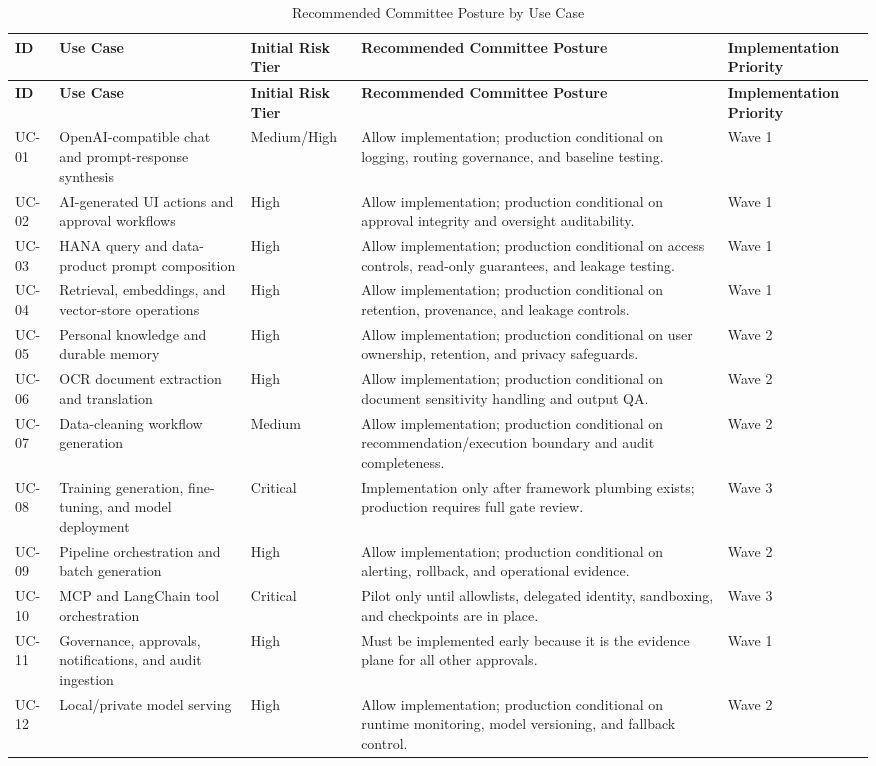 \documentclass[11pt,a4paper]{article}
\begin{document}
\begin{longtable}{P{0.08\textwidth}P{0.24\textwidth}P{0.12\textwidth}P{0.24\textwidth}P{0.18\textwidth}}
\caption{Recommended Committee Posture by Use Case} \\
\toprule
\textbf{ID} & \textbf{Use Case} & \textbf{Initial Risk Tier} & \textbf{Recommended Committee Posture} & \textbf{Implementation Priority} \\
\midrule
\endfirsthead
\toprule
\textbf{ID} & \textbf{Use Case} & \textbf{Initial Risk Tier} & \textbf{Recommended Committee Posture} & \textbf{Implementation Priority} \\
\midrule
\endhead
UC-01 & OpenAI-compatible chat and prompt-response synthesis & Medium/High & Allow implementation; production conditional on logging, routing governance, and baseline testing. & Wave 1 \\
UC-02 & AI-generated UI actions and approval workflows & High & Allow implementation; production conditional on approval integrity and oversight auditability. & Wave 1 \\
UC-03 & HANA query and data-product prompt composition & High & Allow implementation; production conditional on access controls, read-only guarantees, and leakage testing. & Wave 1 \\
UC-04 & Retrieval, embeddings, and vector-store operations & High & Allow implementation; production conditional on retention, provenance, and leakage controls. & Wave 1 \\
UC-05 & Personal knowledge and durable memory & High & Allow implementation; production conditional on user ownership, retention, and privacy safeguards. & Wave 2 \\
UC-06 & OCR document extraction and translation & High & Allow implementation; production conditional on document sensitivity handling and output QA. & Wave 2 \\
UC-07 & Data-cleaning workflow generation & Medium & Allow implementation; production conditional on recommendation/execution boundary and audit completeness. & Wave 2 \\
UC-08 & Training generation, fine-tuning, and model deployment & Critical & Implementation only after framework plumbing exists; production requires full gate review. & Wave 3 \\
UC-09 & Pipeline orchestration and batch generation & High & Allow implementation; production conditional on alerting, rollback, and operational evidence. & Wave 2 \\
UC-10 & MCP and LangChain tool orchestration & Critical & Pilot only until allowlists, delegated identity, sandboxing, and checkpoints are in place. & Wave 3 \\
UC-11 & Governance, approvals, notifications, and audit ingestion & High & Must be implemented early because it is the evidence plane for all other approvals. & Wave 1 \\
UC-12 & Local/private model serving & High & Allow implementation; production conditional on runtime monitoring, model versioning, and fallback control. & Wave 2 \\
\bottomrule
\end{longtable}
\end{document}
